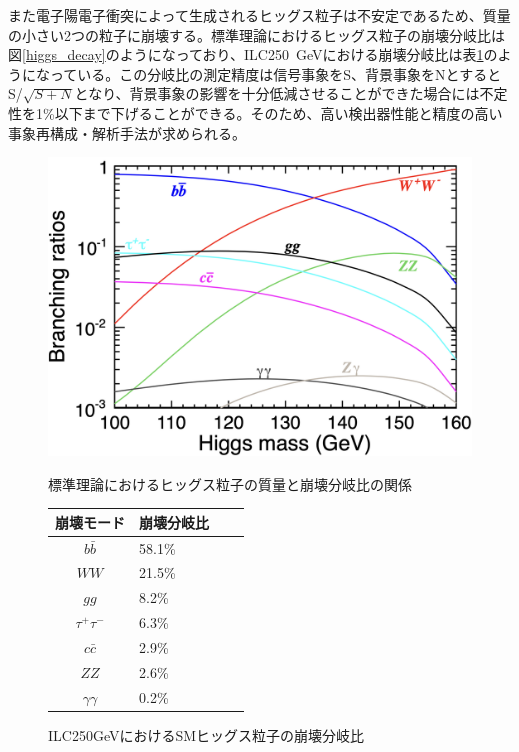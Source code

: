 また電子陽電子衝突によって生成されるヒッグス粒子は不安定であるため、質量の小さい2つの粒子に崩壊する。標準理論におけるヒッグス粒子の崩壊分岐比は図\ref{higgs_decay}のようになっており、ILC250\ GeVにおける崩壊分岐比は表\ref{HiggsDecayonILC}のようになっている。この分岐比の測定精度は信号事象をS、背景事象をNとするとS/$\sqrt{S+N}$となり、背景事象の影響を十分低減させることができた場合には不定性を1\%以下まで下げることができる。そのため、高い検出器性能と精度の高い事象再構成・解析手法が求められる。\\
\begin{figure}[H]
 \begin{minipage}[h]{.45\linewidth}
	\begin{center}
 \includegraphics[keepaspectratio, scale=0.2]
 	{Figure/Introduction/higgs_decay.png}
 		\caption{標準理論におけるヒッグス粒子の質量と崩壊分岐比の関係}
 		\label{higgs_decay}
	\end{center}
 \end{minipage}
 \hfill
\begin{minipage}[h]{.45\linewidth}
\def\@captype{table}
 \centering
  \begin{tabular}{clll}
   \hline
   崩壊モード & 崩壊分岐比\\
   \hline \hline
   $b\bar{b}$ & 58.1\%\\
   $WW$ & 21.5\%\\
   $gg$ & 8.2\%\\
   ${\tau}^+ {\tau}^-$ & 6.3\%\\
   $c \bar{c}$ & 2.9\%\\
   $ZZ$ & 2.6\%\\
   $\gamma \gamma$ & 0.2\%\\
   \hline
  \end{tabular}
   \caption{ILC250GeVにおけるSMヒッグス粒子の崩壊分岐比}
   \label{HiggsDecayonILC}
 \end{minipage}
 \end{figure}

